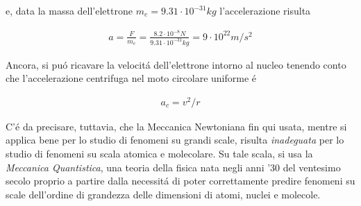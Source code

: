 \documentclass[17pt]{extarticle}
\begin{document}
e, data la massa dell'elettrone $m_e= 9.31\cdot 10^{-31}kg$ l'accelerazione risulta

\begin{eqnarray}
	a = \frac{F}{m_e} = \frac{8.2\cdot 10^{-8}N}{9.31\cdot 10^{-31}kg } = 9\cdot 10^{22}m/s^2
\end{eqnarray}

Ancora, si pu\'o ricavare la velocit\'a dell'elettrone intorno al nucleo tenendo conto che l'accelerazione centrifuga nel moto circolare uniforme \'e 

\begin{eqnarray}
	a_c = v^2/r
\end{eqnarray}
	
C'\'e da precisare, tuttavia, che la Meccanica Newtoniana fin qui usata, mentre si applica bene per lo studio di fenomeni su grandi scale, risulta \emph{inadeguata} per lo studio di fenomeni su scala atomica e molecolare. Su tale scala, si usa la \emph{Meccanica Quantistica}, una teoria della fisica nata negli anni '30 del ventesimo secolo proprio a partire dalla necessit\'a di poter correttamente predire fenomeni su scale dell'ordine di grandezza delle dimensioni di atomi, nuclei e molecole.	
	
	
\end{document}
